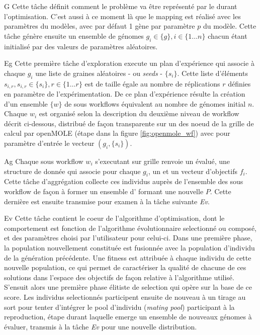 \begin{myitemize}

\item[G] Cette tâche définit comment le problème va être représenté par le  durant l'optimisation. C'est aussi à ce moment là que le mapping est réalisé avec les paramètres du modèles, avec par défaut 1 gène par paramètre $p$ du modèle. Cette tâche génère ensuite un ensemble de génomes $g_i \in \{g\}, i \in \{1 \dotsc n\}$ chacun étant initialisé par des valeurs de paramètres aléatoires.

\item[Eg] Cette première tâche d'exploration execute un plan d'expérience qui associe à chaque  $g_i$ une liste de graines aléatoires  - ou \textit{seeds} - $\{s_i\}$. Cette liste d'éléments $s_{i,r} , s_{i,r} \in \{s_i\}, r \in \{1 \dotsc r\}$ est de taille égale au nombre de réplications $r$ définies en paramètre de l'expérimentation. De ce plan d'expérience résulte la création d'un ensemble $\{w\}$ de sous workflows équivalent au nombre de génomes initial $n$. Chaque $w_i$ est organisé selon la description du deuxième niveau de workflow décrit ci-dessous, distribué de façon transparente sur un des noeud de la grille de calcul par openMOLE (étape  dans la figure \ref{fig:openmole_wf}) avec pour paramètre d'entrée le vecteur $(g_i, \{s_i\})$.

\item[Ag] Chaque sous workflow $w_i$ s'executant sur grille renvoie un  évalué, une structure de donnée qui associe pour chaque  $g_i$, un  et un vecteur d'objectifs $f_i$. Cette tâche d'aggrégation collecte ces individus auprès de l'ensemble des sous workflow de façon à former un ensemble d' formant une nouvelle  $P$. Cette dernière est ensuite transmise pour examen à la tâche suivante \textit{Ev}.

\item[Ev] Cette tâche contient le coeur de l'algorithme d'optimisation, dont le comportement est fonction de l'algorithme évolutionnaire selectionné ou composé, et des paramètres choisi par l'utilisateur pour celui-ci. Dans une première phase, la population nouvellement constituée est fusionnée avec la population d'individu de la génération précédente. Une fitness est attribuée à chaque individu de cette nouvelle population, ce qui permet de caractériser la qualité de chacune de ces solutions dans l'espace des objectifs de façon relative à l'algorithme utilisé. S'ensuit alors une première phase élitiste de selection qui opère sur la base de ce score. Les individus selectionnés participent ensuite de nouveau à un tirage au sort pour tenter d'intégrer le pool d'individu (\textit{mating pool}) participant à la reproduction, étape durant laquelle emerge un ensemble de nouveaux génomes à évaluer, transmis à la tâche \textit{Ev} pour une nouvelle distribution.
\end{myitemize}

